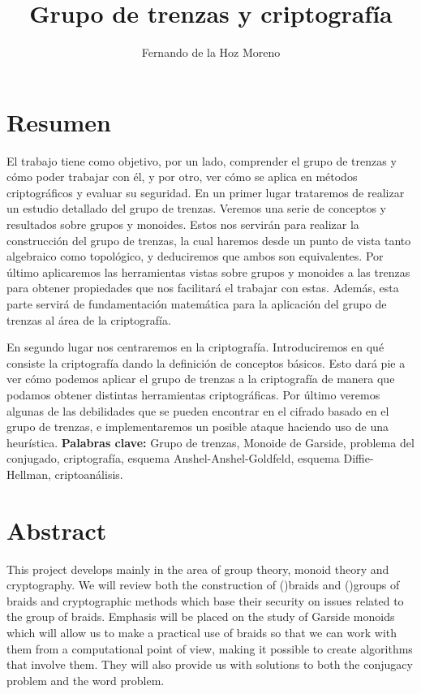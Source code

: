 \documentclass[12pt]{book}
\title{Grupo de trenzas y criptografía}
\author{Fernando de la Hoz Moreno}
\date{}
\theoremstyle{definition}
\begin{document}
 





\newpage
\tableofcontents
\newpage
\chapter*{Resumen}
El trabajo tiene como objetivo, por un lado, comprender el grupo de trenzas y cómo poder trabajar con él, y por otro, ver cómo se aplica en métodos criptográficos y evaluar su seguridad. 
En un primer lugar trataremos de realizar un estudio detallado del grupo de trenzas. Veremos una serie de conceptos y resultados sobre grupos y monoides. Estos nos servirán para realizar la construcción del grupo de trenzas, la cual haremos desde un punto de vista tanto algebraico como topológico, y deduciremos que ambos son equivalentes. Por último aplicaremos las herramientas vistas sobre grupos y monoides a las trenzas para obtener propiedades que nos facilitará el trabajar con estas. Además, esta parte servirá de fundamentación matemática para la aplicación del grupo de trenzas al área de la criptografía.

En segundo lugar nos centraremos en la criptografía. Introduciremos en qué consiste la criptografía dando la definición de conceptos básicos. Esto dará pie a ver cómo podemos aplicar el grupo de trenzas a la criptografía de manera que podamos obtener distintas herramientas criptográficas. Por último veremos algunas de las debilidades que se pueden encontrar en el cifrado basado en el grupo de trenzas, e implementaremos un posible ataque haciendo uso de una heurística.
\newline
\newline
\textbf{Palabras clave:} Grupo de trenzas, Monoide de Garside, problema del conjugado, criptografía, esquema Anshel-Anshel-Goldfeld, esquema Diffie-Hellman, criptoanálisis.

\chapter*{Abstract}


This project develops mainly in the area of group theory, monoid theory and cryptography.  We will review both the construction of ()braids and ()groups of braids and cryptographic methods which base their security on issues related to the group of braids. Emphasis will be placed on the study of Garside monoids which will allow us to make a practical use of braids so that we can work with them from a computational point of view, making it possible to create algorithms that involve them. They will also provide us with solutions to both the conjugacy problem and the word problem.
\end{document}
